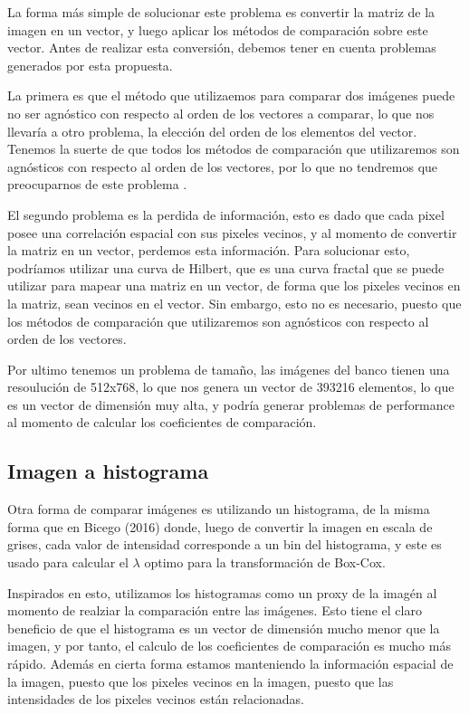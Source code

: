 La forma m\'as simple de solucionar este problema es convertir la matriz de la imagen en un vector, y luego aplicar los m\'etodos de comparaci\'on sobre este vector. Antes de realizar esta conversi\'on, debemos tener en cuenta problemas generados por esta propuesta. 

La primera es que el m\'etodo que utilizaemos para comparar dos im\'agenes puede no ser agn\'ostico con respecto al orden de los vectores a comparar, lo que nos llevaría a otro problema, la elecci\'on del orden de los elementos del vector. Tenemos la suerte de que todos los m\'etodos de comparaci\'on que utilizaremos son agn\'osticos con respecto al orden de los vectores, por lo que no tendremos que preocuparnos de este problema \cite{Reshef2016} \cite{Szekely2009}.

El segundo problema es la perdida de informaci\'on, esto es dado que cada pixel posee una correlaci\'on espacial con sus pixeles vecinos, y al momento de convertir la matriz en un vector, perdemos esta informaci\'on. Para solucionar esto, podr\'iamos utilizar una curva de Hilbert, que es una curva fractal que se puede utilizar para mapear una matriz en un vector, de forma que los pixeles vecinos en la matriz, sean vecinos en el vector. Sin embargo, esto no es necesario, puesto que los m\'etodos de comparaci\'on que utilizaremos son agn\'osticos con respecto al orden de los vectores.

Por ultimo tenemos un problema de tama\~no, las im\'agenes del banco tienen una resouluci\'on de 512x768, lo que nos genera un vector de 393216 elementos, lo que es un vector de dimensi\'on muy alta, y podr\'ia generar problemas de performance al momento de calcular los coeficientes de comparaci\'on. 

\subsection{Imagen a histograma}

Otra forma de comparar im\'agenes es utilizando un histograma, de la misma forma que en Bicego (2016)\cite{bicego2016} donde, luego de convertir la imagen en escala de grises, cada valor de intensidad corresponde a un bin del histograma, y este es usado para calcular el $\lambda$ optimo para la transformaci\'on de Box-Cox. 

Inspirados en esto, utilizamos los histogramas como un proxy de la imag\'en al momento de realziar la comparaci\'on entre las im\'agenes. Esto tiene el claro beneficio de que el histograma es un vector de dimensi\'on mucho menor que la imagen, y por tanto, el calculo de los coeficientes de comparaci\'on es mucho m\'as r\'apido. Adem\'as en cierta forma estamos manteniendo la informaci\'on espacial de la imagen, puesto que los pixeles vecinos en la imagen, puesto que las intensidades de los pixeles vecinos est\'an relacionadas. 


